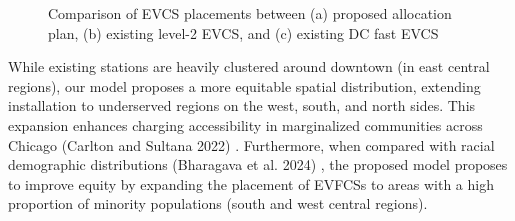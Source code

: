 \documentclass[preprint,12pt]{elsarticle}
\begin{document}
\begin{figure}[htb]
    \centering
    \qquad
    \qquad
    
    \captionsetup{format=plain, font=small, labelfont=bf}
    \caption{Comparison of EVCS placements between (a) proposed allocation plan, (b) existing level-2 EVCS, and (c) existing DC fast EVCS}
    \label{fig:cep}
\end{figure}

While existing stations are heavily clustered around downtown (in east central regions), our model proposes a more equitable spatial distribution, extending installation to underserved regions on the west, south, and north sides. This expansion enhances charging accessibility in marginalized communities across Chicago (Carlton and Sultana 2022) \cite{Carlton2022}. Furthermore, when compared with racial demographic distributions (Bharagava et al. 2024) \cite{Bhargava2024}, the proposed model proposes to improve equity by expanding the placement of EVFCSs to areas with a high proportion of minority populations (south and west central regions). 
\end{document}
